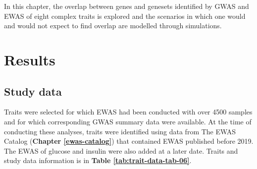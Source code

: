 \documentclass[11pt,oneside]{bristolthesis}
\begin{document}
In this chapter, the overlap between genes and genesets identified by GWAS and EWAS of eight complex traits is explored and the scenarios in which one would and would not expect to find overlap are modelled through simulations.

\hypertarget{results-06}{%
\section{Results}\label{results-06}}

\hypertarget{study-data}{%
\subsection{Study data}\label{study-data}}

Traits were selected for which EWAS had been conducted with over 4500 samples and for which corresponding GWAS summary data were available. At the time of conducting these analyses, traits were identified using data from The EWAS Catalog (\textbf{Chapter \ref{ewas-catalog}}) that contained EWAS published before 2019. The EWAS of glucose and insulin were also added at a later date. Traits and study data information is in \textbf{Table \ref{tab:trait-data-tab-06}}.
\end{document}
